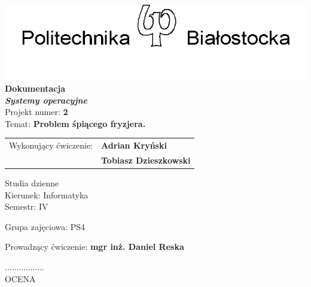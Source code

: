\documentclass[12pt,a4paper]{article}
\newcommand{\numerzajec}{2}
\newcommand{\tematzajec}{Problem śpiącego fryzjera.}
\begin{document}
	\thispagestyle{empty}
	\begin{center}
		\vspace*{1.6cm}
		\includegraphics[width=0.55\linewidth]{pblogo.png}	\\
		\vspace{0.5cm}
		\large
		\textsf{\textbf{Dokumentacja}} \\
		\vspace{0.5cm}
		\textsf{\textbf{\textit{Systemy operacyjne}}}	\\
		\vspace{1cm}
		\textsf{Projekt numer: \textbf{\numerzajec}}	\\
		\vspace{0.5cm}
		\textsf{Temat: \textbf{\tematzajec}}
	\end{center}

	\vspace{2cm}
	\begin{tabular}{rl}
        Wykonujący ćwiczenie: & \textbf{Adrian Kryński} \\
                              &\textbf{Tobiasz Dzieszkowski} \\        									
	\end{tabular}

	\vspace{3.5cm}		

	\begin{minipage}{0.45\linewidth}
		\large
		\begin{spacing}{1.5}
		Studia dzienne \\
		Kierunek: Informatyka \\
		Semestr: IV \\
		\end{spacing}
	\end{minipage}
	\begin{minipage}[t]{0.5\linewidth}
		\large
		\begin{spacing}{1.2}
		Grupa zajęciowa: PS4
		\end{spacing}
	\end{minipage}
	
	Prowadzący ćwiczenie: \textbf{mgr inż. Daniel Reska} \\
	
	\begin{flushright}
		\begin{minipage}[t]{0.3\linewidth}
			\centering
			................. \\
			\small OCENA
		\end{minipage}
	\end{flushright}
	
\end{document}
